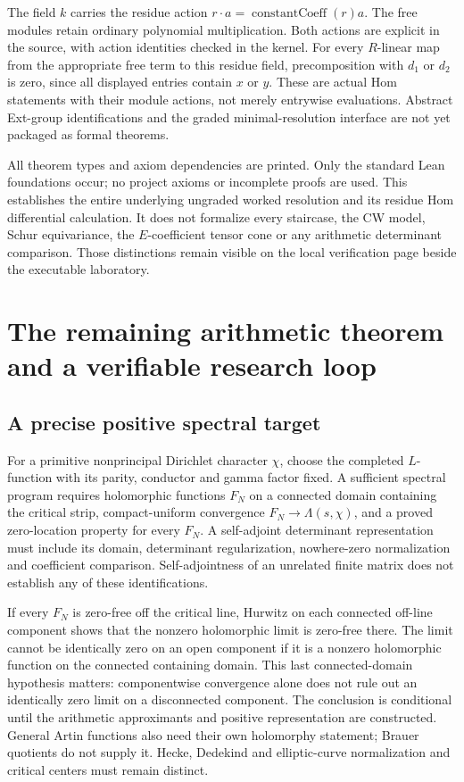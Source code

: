 \documentclass[11pt,oneside,openany]{book}
\theoremstyle{definition}\newtheorem{definition}[theorem]{Definition}
\theoremstyle{remark}\newtheorem{remark}[theorem]{Remark}
\begin{document}
The field $k$ carries the residue action
$r\cdot a=\operatorname{constantCoeff}(r)a$.
The free modules retain ordinary polynomial multiplication. Both actions
are explicit in the source, with action identities checked in the kernel.
For every $R$-linear map from the appropriate free term to this residue
field, precomposition with $d_1$ or $d_2$ is zero, since all displayed
entries contain $x$ or $y$. These are actual Hom statements with their
module actions, not merely entrywise evaluations. Abstract Ext-group
identifications and the graded minimal-resolution interface are not yet
packaged as formal theorems.

All theorem types and axiom dependencies are printed. Only the standard
Lean foundations occur; no project axioms or incomplete proofs are used.
This establishes the entire underlying ungraded worked resolution and its
residue Hom differential calculation. It does not formalize every staircase,
the CW model, Schur equivariance, the $E$-coefficient tensor cone or any
arithmetic determinant comparison. Those distinctions remain visible on
the local verification page beside the executable laboratory.

\chapter{The remaining arithmetic theorem and a verifiable research loop}
\label{book:frontier}
\section{A precise positive spectral target}
For a primitive nonprincipal Dirichlet character $\chi$, choose the completed $L$-function with its parity, conductor and gamma factor fixed. A sufficient spectral program requires holomorphic functions $F_N$ on a connected domain containing the critical strip, compact-uniform convergence $F_N\to\Lambda(s,\chi)$, and a proved zero-location property for every $F_N$. A self-adjoint determinant representation must include its domain, determinant regularization, nowhere-zero normalization and coefficient comparison. Self-adjointness of an unrelated finite matrix does not establish any of these identifications.

If every $F_N$ is zero-free off the critical line, Hurwitz on each connected off-line component shows that the nonzero holomorphic limit is zero-free there. The limit cannot be identically zero on an open component if it is a nonzero holomorphic function on the connected containing domain. This last connected-domain hypothesis matters: componentwise convergence alone does not rule out an identically zero limit on a disconnected component. The conclusion is conditional until the arithmetic approximants and positive representation are constructed. General Artin functions also need their own holomorphy statement; Brauer quotients do not supply it. Hecke, Dedekind and elliptic-curve normalization and critical centers must remain distinct.
\end{document}
